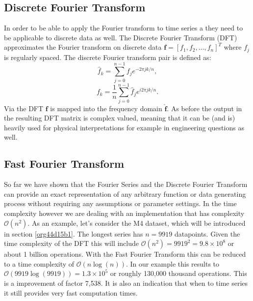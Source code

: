 \documentclass[phd,black, hidelinks]{PrincetonThesis}
\newcommand{\euler}{e}
\begin{document}
\subsection{Discrete Fourier Transform}
\label{sec:org34de652}

In order to be able to apply the Fourier transform to time series a they need to be applicable to discrete data as well. The Discrete Fourier Transform (DFT) approximates the Fourier transform on discrete data \(\textbf{f} = [f_1, f_2, \dots, f_n]^T\) where \(f_j\) is regularly spaced.
The discrete Fourier transform pair is defined as:
\begin{equation}
\hat{f}_k = \sum_{j=0}^{n-1} f_j\euler^{-2\pi jk/n},
\end{equation}
\begin{equation}
f_k = \frac{1}{n} \sum_{j=0}^{n-1}\hat{f}_j\euler^{i2\pi jk/n}.
\end{equation}
Via the DFT \(\textbf{f}\) is mapped into the frequency domain \(\hat{\textbf{f}}\). As before the output in the resulting DFT matrix is complex valued, meaning that it can be (and is) heavily used for physical interpretations for example in engineering questions as well.
\subsection{Fast Fourier Transform}
\label{sec:org63fe976}

So far we have shown that the Fourier Series and the Discrete Fourier Transform can provide an exact representation of any arbitrary function or data generating process without requiring any assumptions or parameter settings. In the time complexity however we are dealing with an implementation that has complexity \(\mathcal{O}(n^2)\). As an example, let's consider the M4 dataset, which will be introduced in section \ref{org44d15b1}. The longest series has \(n=9919\) datapoints. Given the time complexity of the DFT this will include \(\mathcal{O}(n^2)=9919^2=9.8 \times 10^8\) or about 1 billion operations. With the Fast Fourier Transform this can be reduced to a time complexity of \(\mathcal{O}(n \log(n))\). In our example this results to \(\mathcal{O}(9919 \log(9919)) = 1.3 \times 10^5\) or roughly 130,000 thousand operations. This is a improvement of factor 7,538. It is also an indication that when to time series it still provides very fast computation times.
\end{document}
